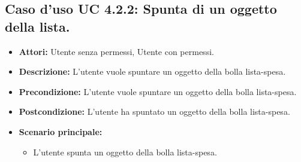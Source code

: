 \subsection{Caso d'uso UC 4.2.2: Spunta di un oggetto della lista.}
\label{Caso d'uso UC 4.2.2: Spunta di un oggetto della lista.}

\FloatBarrier
\begin{itemize}
\item \textbf{Attori:} Utente senza permessi, Utente con permessi.
\item \textbf{Descrizione:} L'utente vuole spuntare un oggetto della bolla lista-spesa.
\item \textbf{Precondizione:} L'utente vuole spuntare un oggetto della bolla lista-spesa. 
\item \textbf{Postcondizione:} L'utente ha spuntato un oggetto della bolla lista-spesa.
\item \textbf{Scenario principale:}
	\begin{itemize}
	\item{L'utente spunta un oggetto della bolla lista-spesa.}
	\end{itemize}
\end{itemize}